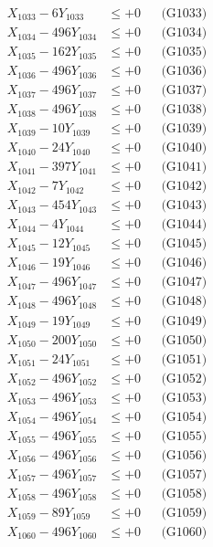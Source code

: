 \documentclass[a4paper,10pt]{article}
\begin{document}
{\begin{align}
X_{1033} - 6Y_{1033} &\leq +0 && \text{(G1033)} \\
X_{1034} - 496Y_{1034} &\leq +0 && \text{(G1034)} \\
X_{1035} - 162Y_{1035} &\leq +0 && \text{(G1035)} \\
X_{1036} - 496Y_{1036} &\leq +0 && \text{(G1036)} \\
X_{1037} - 496Y_{1037} &\leq +0 && \text{(G1037)} \\
X_{1038} - 496Y_{1038} &\leq +0 && \text{(G1038)} \\
X_{1039} - 10Y_{1039} &\leq +0 && \text{(G1039)} \\
X_{1040} - 24Y_{1040} &\leq +0 && \text{(G1040)} \\
\allowbreak
X_{1041} - 397Y_{1041} &\leq +0 && \text{(G1041)} \\
X_{1042} - 7Y_{1042} &\leq +0 && \text{(G1042)} \\
X_{1043} - 454Y_{1043} &\leq +0 && \text{(G1043)} \\
X_{1044} - 4Y_{1044} &\leq +0 && \text{(G1044)} \\
X_{1045} - 12Y_{1045} &\leq +0 && \text{(G1045)} \\
X_{1046} - 19Y_{1046} &\leq +0 && \text{(G1046)} \\
X_{1047} - 496Y_{1047} &\leq +0 && \text{(G1047)} \\
X_{1048} - 496Y_{1048} &\leq +0 && \text{(G1048)} \\
X_{1049} - 19Y_{1049} &\leq +0 && \text{(G1049)} \\
X_{1050} - 200Y_{1050} &\leq +0 && \text{(G1050)} \\
\allowbreak
X_{1051} - 24Y_{1051} &\leq +0 && \text{(G1051)} \\
X_{1052} - 496Y_{1052} &\leq +0 && \text{(G1052)} \\
X_{1053} - 496Y_{1053} &\leq +0 && \text{(G1053)} \\
X_{1054} - 496Y_{1054} &\leq +0 && \text{(G1054)} \\
X_{1055} - 496Y_{1055} &\leq +0 && \text{(G1055)} \\
X_{1056} - 496Y_{1056} &\leq +0 && \text{(G1056)} \\
X_{1057} - 496Y_{1057} &\leq +0 && \text{(G1057)} \\
X_{1058} - 496Y_{1058} &\leq +0 && \text{(G1058)} \\
X_{1059} - 89Y_{1059} &\leq +0 && \text{(G1059)} \\
X_{1060} - 496Y_{1060} &\leq +0 && \text{(G1060)} \\

\end{align}}
\end{document}
